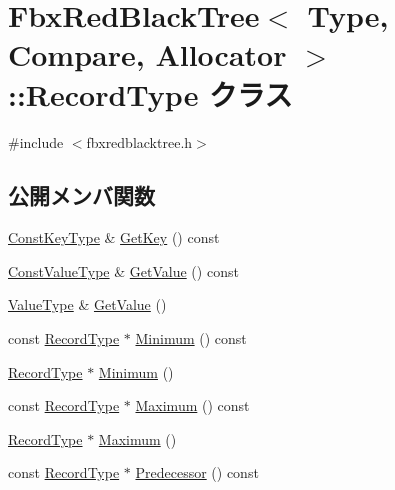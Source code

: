 \hypertarget{class_fbx_red_black_tree_1_1_record_type}{}\section{Fbx\+Red\+Black\+Tree$<$ Type, Compare, Allocator $>$\+:\+:Record\+Type クラス}
\label{class_fbx_red_black_tree_1_1_record_type}


{\ttfamily \#include $<$fbxredblacktree.\+h$>$}

\subsection*{公開メンバ関数}
\begin{DoxyCompactItemize}
\item 
\hyperlink{class_fbx_red_black_tree_ad0aa82c0fd952b04edb550fc1fb36a32}{Const\+Key\+Type} \& \hyperlink{class_fbx_red_black_tree_1_1_record_type_a3844e4735fb81e224eb8c24cedc761c5}{Get\+Key} () const
\item 
\hyperlink{class_fbx_red_black_tree_a60ce913af196ee4cf886585363c4b0ca}{Const\+Value\+Type} \& \hyperlink{class_fbx_red_black_tree_1_1_record_type_a300348e40e4648c7371d20c398862bec}{Get\+Value} () const
\item 
\hyperlink{class_fbx_red_black_tree_a178e34888fa8c0fab5a7527ab30a663c}{Value\+Type} \& \hyperlink{class_fbx_red_black_tree_1_1_record_type_a7c5822c8b6c41757eaafe32e37cfbdb4}{Get\+Value} ()
\item 
const \hyperlink{class_fbx_red_black_tree_1_1_record_type}{Record\+Type} $\ast$ \hyperlink{class_fbx_red_black_tree_1_1_record_type_ac7846a2d9d25168a1f9d62b53b2ffa8b}{Minimum} () const
\item 
\hyperlink{class_fbx_red_black_tree_1_1_record_type}{Record\+Type} $\ast$ \hyperlink{class_fbx_red_black_tree_1_1_record_type_a19afa18da8e3def639d0f4e8e9ab1a39}{Minimum} ()
\item 
const \hyperlink{class_fbx_red_black_tree_1_1_record_type}{Record\+Type} $\ast$ \hyperlink{class_fbx_red_black_tree_1_1_record_type_a6749244cf93a46657d689bd51b67ed04}{Maximum} () const
\item 
\hyperlink{class_fbx_red_black_tree_1_1_record_type}{Record\+Type} $\ast$ \hyperlink{class_fbx_red_black_tree_1_1_record_type_a6168efad3c4168277be9c9bea791d88f}{Maximum} ()
\item 
const \hyperlink{class_fbx_red_black_tree_1_1_record_type}{Record\+Type} $\ast$ \hyperlink{class_fbx_red_black_tree_1_1_record_type_a10f8bec68c060c659f9f649449939cb2}{Predecessor} () const

\end{DoxyCompactItemize}
